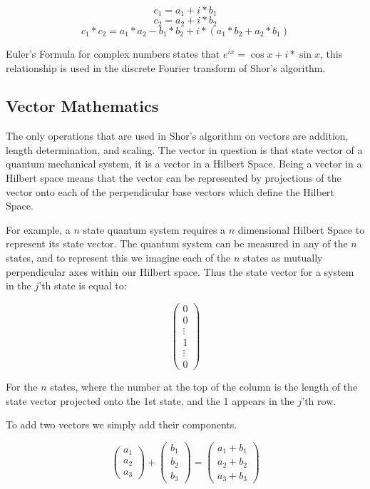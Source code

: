 \documentclass[]{article}
\begin{document}
	\[c_{1} = a_{1} + i * b_{1}\]
	\[c_{2} = a_{2} + i * b_{2}\]
	\[c_{1}*c_{2}=a_{1}*a_{2}-b_{1}*b_{2}+i*(a_{1}*b_{2}+a_{2}*b_{1})\]

Euler's Formula for complex numbers states that $e^{ix} = \cos x + i * \sin x$, this relationship is used in the discrete Fourier transform of Shor's algorithm.

\subsection{Vector Mathematics}

The only operations that are used in Shor's algorithm on vectors are
addition, length determination, and scaling.  The vector in question
is that state vector of a quantum mechanical system, it is a vector in
a Hilbert Space.  Being a vector in a Hilbert space means that the
vector can be represented by projections of the vector onto each of
the perpendicular base vectors which define the Hilbert Space.

For example, a $n$ state quantum system requires a $n$ dimensional
Hilbert Space to represent its state vector.  The quantum system can
be measured in any of the $n$ states, and to represent this we imagine
each of the $n$ states as mutually perpendicular axes within our
Hilbert space.  Thus the state vector for a system in the $j$'th state
is equal to:

\[\left( \begin{array}{c} 
	0 \\ 
	0 \\ 
	\vdots \\ 
	1 \\ 
	\vdots \\ 
	0 
	\end{array} 
\right)\]

For the $n$ states, where the number at the top of the column is the
length of the state vector projected onto the 1st state, and the 1
appears in the $j$'th row.

To add two vectors we simply add their components.

\[\left( \begin{array}{l} 
	a_{1} \\
	a_{2} \\ 
	a_{3} 
	\end{array} 
\right) +
\left( \begin{array}{c} 
	b_{1} \\ b_{2} \\ b_{3} \end{array} \right) =
\left( \begin{array}{r} a_{1}+b_{1} \\ a_{2}+b_{2} \\ a_{3}+b_{3} \end{array} \right)\]
\end{document}
